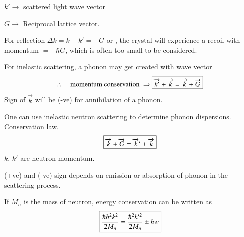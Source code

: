 \noindent
$k'\to$ scattered light wave vector

\noindent
$G\to$ Reciprocal lattice vector.

For reflection $\Delta k=k-k'=-G$ or , the crystal will experience a recoil with momentum $=-\hbar G$, which is often too small to be considered.

For inelastic scattering, a phonon may get created with wave vector
$$
\therefore\quad \text{momentum conservation } \Rightarrow \fbox{$\overrightarrow{k'}+\overrightarrow{k}=\overrightarrow{k}+\overrightarrow{G}$}
$$
Sign of $\overrightarrow{k}$ will be (-ve) for annihilation of a phonon.

One can use inelastic neutron scattering to determine phonon dispersions. Conservation law.
$$
\fbox{$\overrightarrow{k}+\overrightarrow{G}=\overrightarrow{k}'\pm \overrightarrow{k}$}
$$
$k$, $k'$ are neutron momentum.

(+ve) and (-ve) sign depends on emission or absorption of phonon in the scattering process.

If $M_{n}$ is the mass of neutron, energy conservation can be written as
$$
\fbox{$\dfrac{\hbar{h}^{2}k^{2}}{2M_{n}}=\dfrac{\hbar^{2}k'^{2}}{2M_{n}}\pm \hbar w$}
$$


